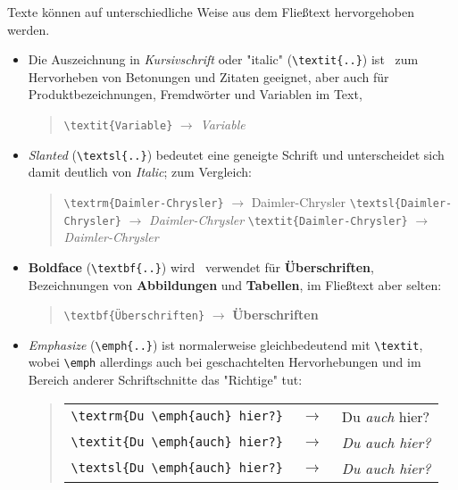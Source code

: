 Texte können auf unterschiedliche Weise aus dem Fließtext hervorgehoben werden.
%
\begin{itemize}
    \item Die Auszeichnung in \textit{Kursivschrift} oder "italic"
    (\verb!\textit{..}!) ist \va\ zum Hervorheben von Betonungen und Zitaten
    geeignet, aber auch für Produktbezeichnungen, Fremdwörter und Variablen
    im Text, \zB
    \begin{quote}
        \verb!\textit{Variable}! $\rightarrow$ \textit{Variable}
    \end{quote}

    \item \textsl{Slanted} %
    (\verb!\textsl{..}!) bedeutet eine geneigte Schrift und unterscheidet
    sich damit deutlich von \textit{Italic}; zum Vergleich:
    \begin{quote}
        \verb!\textrm{Daimler-Chrysler}! $\rightarrow$
        \textrm{Daimler-Chrysler} \newline%
        \verb!\textsl{Daimler-Chrysler}! $\rightarrow$
        \textsl{Daimler-Chrysler} \newline%
        \verb!\textit{Daimler-Chrysler}! $\rightarrow$ \textit{Daimler-Chrysler}
    \end{quote}
%
    \item \textbf{Boldface} (\verb!\textbf{..}!) wird \ia\ verwendet für
    \textbf{Überschriften}, Bezeichnungen von \textbf{Abbildungen} und
    \textbf{Tabellen}, im Fließtext aber selten:
    \begin{quote}
        \verb!\textbf{Überschriften}! $\rightarrow$ \textbf{Überschriften}
    \end{quote}
%
    \item \emph{Emphasize} (\verb!\emph{..}!) %
    ist normalerweise gleichbedeutend mit \verb!\textit!, wobei
    \verb!\emph! allerdings auch bei geschachtelten Hervorhebungen und im
    Bereich anderer Schriftschnitte das "Richtige" tut:
    \begin{quote}
        \setlength{\tabcolsep}{0pt}%
        \begin{tabular}{lcl}
            \verb!\textrm{Du \emph{auch} hier?}! & $\;\rightarrow\;$ &
            \textrm{Du \emph{auch} hier?} \\
            \verb!\textit{Du \emph{auch} hier?}! & $\;\rightarrow\;$ &
            \textit{Du \emph{auch} hier?} \\
            \verb!\textsl{Du \emph{auch} hier?}! & $\;\rightarrow\;$ &
            \textsl{Du \emph{auch} hier?} \\

\end{tabular}
\end{quote}
\end{itemize}
